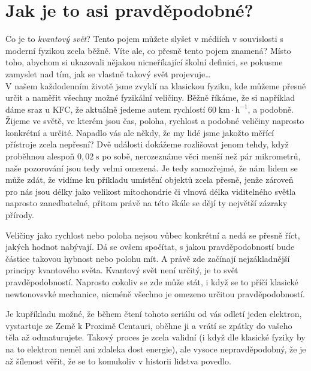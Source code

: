 \documentclass[crop=false]{standalone}
\begin{document}
\section*{Jak je to asi pravděpodobné?}
\quad

Co je to \textit{kvantový svět}? Tento pojem můžete slyšet v médiích v souvislosti s moderní fyzikou zcela běžně. 
Víte ale, co přesně tento pojem znamená? Místo toho, abychom si ukazovali nějakou nicneříkající školní definici, 
se pokusme zamyslet nad tím, jak se vlastně takový svět projevuje\dots
\\

V našem každodenním životě jsme zvyklí na klasickou fyziku, kde můžeme přesně určit a naměřit všechny možné fyzikální veličiny. 
Běžně říkáme, že si například dáme sraz u KFC, že aktuálně jedeme autem rychlostí $60\;\mathrm{km\cdot h^{-1}}$, a podobně. 
Žijeme ve světě, ve kterém jsou čas, poloha, rychlost a podobné veličiny naprosto konkrétní a určité. Napadlo vás ale někdy, 
že my lidé jsme jakožto měřící přístroje zcela nepřesní? Dvě události dokážeme rozlišovat jenom tehdy, když proběhnou alespoň 
$0,02\;\mathrm{s}$ po sobě, nerozeznáme věci menší než pár mikrometrů, naše pozorování jsou tedy velmi omezená. Je tedy samozřejmé, 
že nám lidem se může zdát, že vidíme ku příkladu umístění objektů zcela přesně, jenže zároveň pro nás jsou délky jako velikost 
mitochondrie či vlnová délka viditelného světla naprosto zanedbatelné, přitom právě na této škále se dějí ty největší zázraky přírody.


Veličiny jako rychlost nebo poloha nejsou vůbec konkrétní a nedá se přesně říct, jakých hodnot nabývají. Dá se ovšem spočítat, s jakou 
pravděpodobností bude částice takovou hybnost nebo polohu mít. A právě zde začínají nejzákladnější principy kvantového světa. 
Kvantový svět není určitý, je to svět pravděpodobností. Naprosto cokoliv se zde může stát, i když se to příčí klasické newtonovsvké 
mechanice, nicméně všechno je omezeno určitou pravděpodobností.


Je kupříkladu možné, že během čtení tohoto seriálu od vás odletí jeden elektron, vystartuje ze Země k Proximě Centauri, oběhne ji a 
vrátí se zpátky do vašeho těla až odmaturujete. Takový proces je zcela validní (i když dle klasické fyziky by na to elektron neměl ani 
zdaleka dost energie), ale vysoce nepravděpodobný, že je až šílenost věřit, že se to komukoliv v historii lidstva povedlo.
\end{document}
